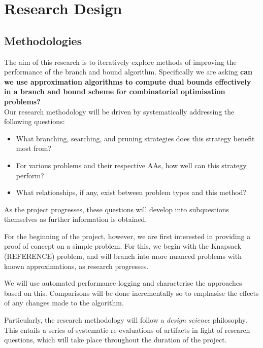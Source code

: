 \documentclass[12pt, a4paper]{article}
\begin{document}
\section{Research Design}

\subsection{Methodologies}

The aim of this research is to iteratively explore methods of improving the performance of the branch and bound algorithm. Specifically we are asking \textbf{can we use approximation algorithms to compute dual bounds effectively in a branch and bound scheme for combinatorial optimisation problems?}\\
Our research methodology will be driven by systematically addressing the following questions:

\begin{itemize}
\item What branching, searching, and pruning strategies does this strategy benefit most from?
\item For various problems and their respective AAs, how well can this strategy perform?
\item What relationships, if any, exist between problem types and this method?
\end{itemize}

As the project progresses, these questions will develop into subquestions themselves as further information is obtained.

For the beginning of the project, however, we are first interested in providing a proof of concept on a simple problem. For this, we begin with the Knapsack (REFERENCE) problem, and will branch into more nuanced problems with known approximations, as research progresses.

We will use automated performance logging and characterise the approaches based on this. Comparisons will be done incrementally so to emphasise the effects of any changes made to the algorithm.

Particularly, the research methodology will follow a \textit{design science} philosophy. This entails a series of systematic re-evaluations of artifacts in light of research questions, which will take place throughout the duration of the project. 
\end{document}
